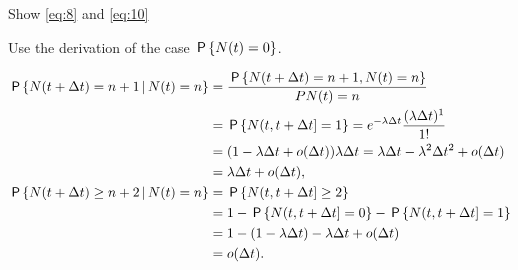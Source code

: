 \documentclass[queueing-book.tex]{subfiles}
\begin{document}
\begin{exercise} \label{ex:p-355}
 Show \cref{eq:8} and  \cref{eq:10}
\begin{hint} Use the derivation of the case $\P{N(t)=0}$.
\end{hint}
\begin{solution}
 \begin{align*}
 \P{N(t+\Delta t) = n +1 \given N(t) = n}
&= \frac{\P{N(t+\Delta t) = n +1 , N(t) =n}}{P{N(t) = n}}\\
&= \P{N(t, t+\Delta t] = 1} = e^{-\lambda \Delta t} \frac{(\lambda \Delta t)^1}{1!} \\
&= (1-\lambda \Delta t + o(\Delta t))\lambda \Delta t = \lambda \Delta t - \lambda^2 \Delta t^2 + o(\Delta t) \\
&= \lambda \Delta t + o(\Delta t),\\
 \P{N(t+\Delta t) \geq n+2 \given N(t) = n}
&= \P{N(t, t+\Delta t] \geq 2} \\
&= 1 - \P{N(t, t+\Delta t] = 0} - \P{N(t, t+\Delta t] = 1}\\
& = 1- (1-\lambda \Delta t) - \lambda \Delta t +o(\Delta t)\\
&= o(\Delta t).
 \end{align*}
\end{solution}
\end{exercise}
\end{document}
